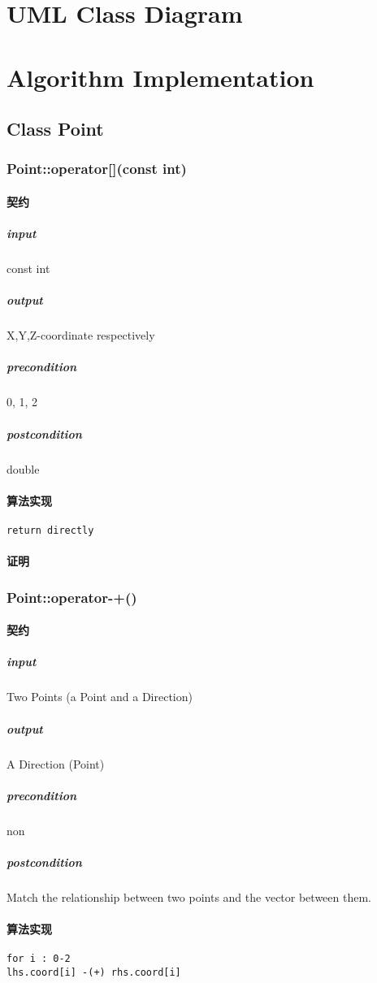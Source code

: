 \documentclass[a4paper]{book}
\numberwithin{equation}{chapter}
\theoremstyle{definition}
\begin{document}
\begin{multicols}{2}
%

\section{UML Class Diagram}
%

\section{Algorithm Implementation}
%
\subsection{Class Point}


\subsubsection{Point::operator[](const int)}
\paragraph{契约}
\subparagraph{input}
const int
\subparagraph{output}
X,Y,Z-coordinate respectively
\subparagraph{precondition}
0, 1, 2
\subparagraph{postcondition}
double
\paragraph{算法实现}
\begin{lstlisting}
return directly
\end{lstlisting}
\paragraph{证明}


\subsubsection{Point::operator-+()}
\paragraph{契约}
\subparagraph{input}
Two Points (a Point and a Direction)
\subparagraph{output}
A Direction (Point)
\subparagraph{precondition}
non
\subparagraph{postcondition}
Match the relationship between two points and the vector between them.

\paragraph{算法实现}
\begin{lstlisting}
for i : 0-2
lhs.coord[i] -(+) rhs.coord[i]
\end{lstlisting}

\end{multicols}
\end{document}
